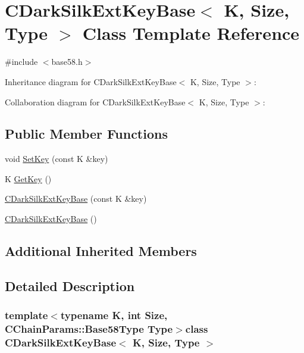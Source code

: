 \hypertarget{class_c_dark_silk_ext_key_base}{}\section{C\+Dark\+Silk\+Ext\+Key\+Base$<$ K, Size, Type $>$ Class Template Reference}
\label{class_c_dark_silk_ext_key_base}


{\ttfamily \#include $<$base58.\+h$>$}



Inheritance diagram for C\+Dark\+Silk\+Ext\+Key\+Base$<$ K, Size, Type $>$\+:


Collaboration diagram for C\+Dark\+Silk\+Ext\+Key\+Base$<$ K, Size, Type $>$\+:
\subsection*{Public Member Functions}
\begin{DoxyCompactItemize}
\item 
void \hyperlink{class_c_dark_silk_ext_key_base_a4a9dbbdfb5a48f1c2763b26e70a6b59a}{Set\+Key} (const K \&key)
\item 
K \hyperlink{class_c_dark_silk_ext_key_base_a4215d28b3fd2a44739e9e16ac334a4be}{Get\+Key} ()
\item 
\hyperlink{class_c_dark_silk_ext_key_base_a699cf62373fd74956072b26036a84521}{C\+Dark\+Silk\+Ext\+Key\+Base} (const K \&key)
\item 
\hyperlink{class_c_dark_silk_ext_key_base_a07005d66bada4496d6f77d5f446decfa}{C\+Dark\+Silk\+Ext\+Key\+Base} ()
\end{DoxyCompactItemize}
\subsection*{Additional Inherited Members}


\subsection{Detailed Description}
\subsubsection*{template$<$typename K, int Size, C\+Chain\+Params\+::\+Base58\+Type Type$>$class C\+Dark\+Silk\+Ext\+Key\+Base$<$ K, Size, Type $>$}



